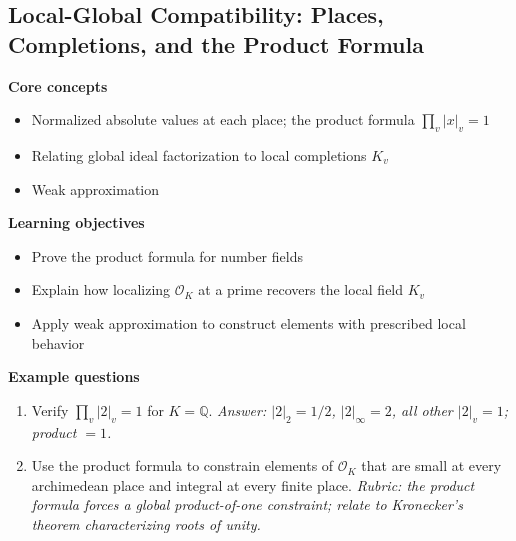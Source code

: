 \documentclass[11pt]{article}
\newcommand{\Q}{\mathbb{Q}}
\newcommand{\OK}{\mathcal{O}_K}
\begin{document}
\subsection{Local-Global Compatibility: Places, Completions, and the Product Formula}
\textbf{Core concepts}
\begin{itemize}[noitemsep]
  \item Normalized absolute values at each place; the product formula $\prod_v |x|_v = 1$
  \item Relating global ideal factorization to local completions $K_v$
  \item Weak approximation
\end{itemize}
\textbf{Learning objectives}
\begin{itemize}[noitemsep]
  \item Prove the product formula for number fields
  \item Explain how localizing $\OK$ at a prime recovers the local field $K_v$
  \item Apply weak approximation to construct elements with prescribed local behavior
\end{itemize}
\textbf{Example questions}
\begin{enumerate}[noitemsep]
  \item[Q1 (foundational).] Verify $\prod_v |2|_v = 1$ for $K = \Q$. \emph{Answer: $|2|_2 = 1/2$, $|2|_\infty = 2$, all other $|2|_v = 1$; product $=1$.}
  \item[Q2 (advanced).] Use the product formula to constrain elements of $\OK$ that are small at every archimedean place and integral at every finite place. \emph{Rubric: the product formula forces a global product-of-one constraint; relate to Kronecker's theorem characterizing roots of unity.}
\end{enumerate}

\end{document}
